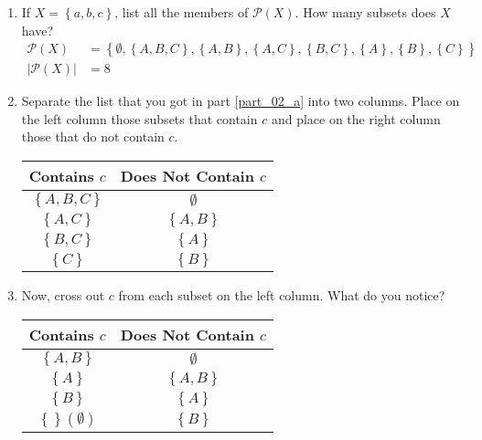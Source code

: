 \documentclass{article}
\begin{document}
\begin{enumerate}[label = \textbf{\alph*)}]
	\item \label{part_02_a} If $ X = \left\{ a, b, c \right\} $, list all the members of $ \mathcal{P}(X) $. How many subsets does $ X $ have?
	      \begin{align*}
		      \mathcal{P}(X)   & = \left\{ \emptyset, \left\{ A, B, C \right\}, \left\{ A, B \right\}, \left\{ A, C \right\}, \left\{ B, C \right\}, \left\{ A \right\}, \left\{ B \right\}, \left\{ C \right\} \right\} \\
		      |\mathcal{P}(X)| & = 8
	      \end{align*}
	\item \label{part_02_b} Separate the list that you got in part \ref{part_02_a} into two columns. Place on the left column those subsets that contain $ c $ and place on the right column those that do not contain $ c $. \\
	      \begin{tabular}{ | c | c | }
		      Contains $ c $               & Does Not Contain $ c $    \\
		      \hline
		      $ \left\{ A, B, C \right\} $ & $ \emptyset $             \\
		      $ \left\{ A, C \right\} $    & $ \left\{ A, B \right\} $ \\
		      $ \left\{ B, C \right\} $    & $ \left\{ A \right\} $    \\
		      $ \left\{ C \right\} $       & $ \left\{ B \right\} $
	      \end{tabular}
	\item \label{part_02_c} Now, cross out $ c $ from each subset on the left column. What do you notice? \\
	      \begin{tabular}{ | c | c | }
		      Contains $ c $                                & Does Not Contain $ c $    \\
		      \hline
		      $ \left\{ A, B \right\} $                     & $ \emptyset $             \\
		      $ \left\{ A \right\} $                        & $ \left\{ A, B \right\} $ \\
		      $ \left\{ B \right\} $                        & $ \left\{ A \right\} $    \\
		      $ \left\{ \right\} \left( \emptyset \right) $ & $ \left\{ B \right\} $
	      \end{tabular}


\end{enumerate}
\end{document}
